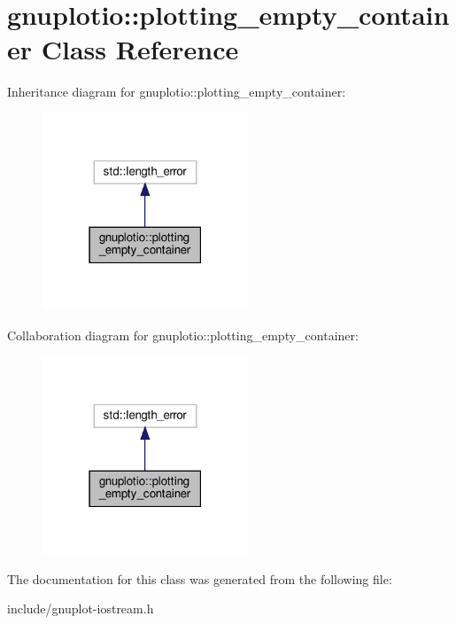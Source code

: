 \hypertarget{classgnuplotio_1_1plotting__empty__container}{}\section{gnuplotio\+:\+:plotting\+\_\+empty\+\_\+container Class Reference}
\label{classgnuplotio_1_1plotting__empty__container}


Inheritance diagram for gnuplotio\+:\+:plotting\+\_\+empty\+\_\+container\+:\nopagebreak
\begin{figure}[H]
\begin{center}
\leavevmode
\includegraphics[width=174pt]{classgnuplotio_1_1plotting__empty__container__inherit__graph}
\end{center}
\end{figure}


Collaboration diagram for gnuplotio\+:\+:plotting\+\_\+empty\+\_\+container\+:\nopagebreak
\begin{figure}[H]
\begin{center}
\leavevmode
\includegraphics[width=174pt]{classgnuplotio_1_1plotting__empty__container__coll__graph}
\end{center}
\end{figure}


The documentation for this class was generated from the following file\+:\begin{DoxyCompactItemize}
\item 
include/gnuplot-\/iostream.\+h\end{DoxyCompactItemize}
